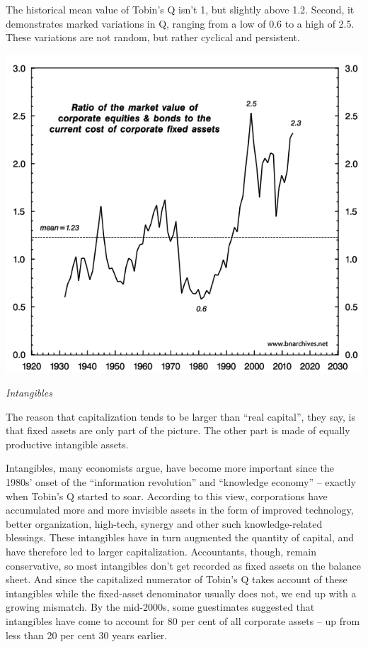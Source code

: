 \documentclass[
]{book}
\begin{document}
The historical mean value of Tobin's Q isn't 1, but slightly above 1.2. Second, it demonstrates marked variations in Q, ranging from a low of 0.6 to a high of 2.5. These variations are not random, but rather cyclical and persistent.

\includegraphics{fig/Tobins_Q_US.png}

\emph{Intangibles}

The reason that capitalization tends to be larger than ``real capital'', they say, is that fixed assets are only part of the picture. The other part is made of equally productive intangible assets.

Intangibles, many economists argue, have become more important since the 1980s' onset of the ``information revolution'' and ``knowledge economy'' -- exactly when Tobin's Q started to soar. According to this view, corporations have accumulated more and more invisible assets in the form of improved technology, better organization, high-tech, synergy and other such knowledge-related blessings. These intangibles have in turn augmented the quantity of capital, and have therefore led to larger capitalization. Accountants, though, remain conservative, so most intangibles don't get recorded as fixed assets on the balance sheet. And since the capitalized numerator of Tobin's Q takes account of these intangibles while the fixed-asset denominator usually does not, we end up with a growing mismatch. By the mid-2000s, some guestimates suggested that intangibles have come to account for 80 per cent of all corporate assets -- up from less than 20 per cent 30 years earlier.
\end{document}
